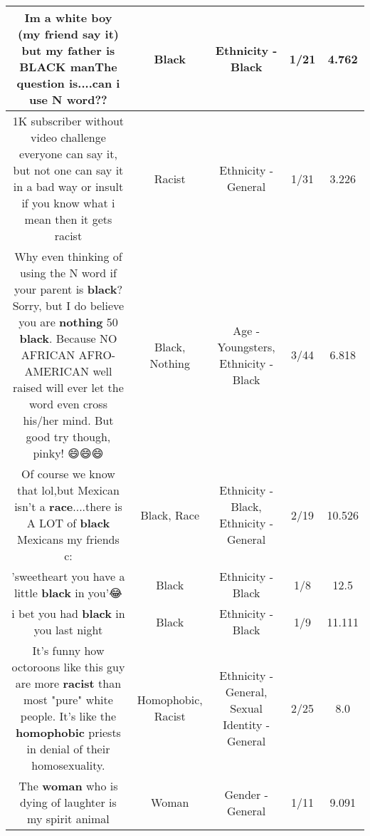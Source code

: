 \documentclass[11pt]{article}
\newlength\mylength
\begin{document}
\begin{center}
\begin{longtable}{|C{.65\mylength}|C{.30\mylength}|C{.12\mylength}|C{.12\mylength}|C{.12\mylength}|}
  \small Im a white boy (my friend say it) but my father is \textbf{BLACK} manThe question is....can i use N word??\normalsize   & Black & Ethnicity - Black & 1/21 & 4.762 \\  \hline
  \small 1K subscriber without video challenge everyone can say it, but not one can say it in a bad way or insult if you know what i mean then it gets racist\normalsize   & Racist & Ethnicity - General & 1/31 & 3.226 \\  \hline
  \small Why even thinking of using the N word if your parent is \textbf{black}? Sorry, but I do believe you are \textbf{nothing} 50 \textbf{black}. Because NO AFRICAN AFRO-AMERICAN well raised will ever let the word even cross his/her mind. But good try though, pinky! 😄😄😄\normalsize   & Black, Nothing & Age - Youngsters, Ethnicity - Black & 3/44 & 6.818 \\  \hline
  \small Of course we know that lol,but Mexican isn't a \textbf{race}....there is A LOT of \textbf{black} Mexicans my friends c:\normalsize   & Black, Race & Ethnicity - Black, Ethnicity - General & 2/19 & 10.526 \\  \hline
  \small 'sweetheart you have a little \textbf{black} in you'😂\normalsize   & Black & Ethnicity - Black & 1/8 & 12.5 \\  \hline
  \small i bet you had \textbf{black} in you last night\normalsize   & Black & Ethnicity - Black & 1/9 & 11.111 \\  \hline
  \small It's funny how octoroons like this guy are more \textbf{racist} than most "pure" white people.  It's like the \textbf{homophobic} priests in denial of their homosexuality.\normalsize   & Homophobic, Racist & Ethnicity - General, Sexual Identity - General & 2/25 & 8.0 \\  \hline
  \small The \textbf{woman} who is dying of laughter is my spirit animal\normalsize   & Woman & Gender - General & 1/11 & 9.091 \\  \hline

\end{longtable}
\end{center}
\end{document}
